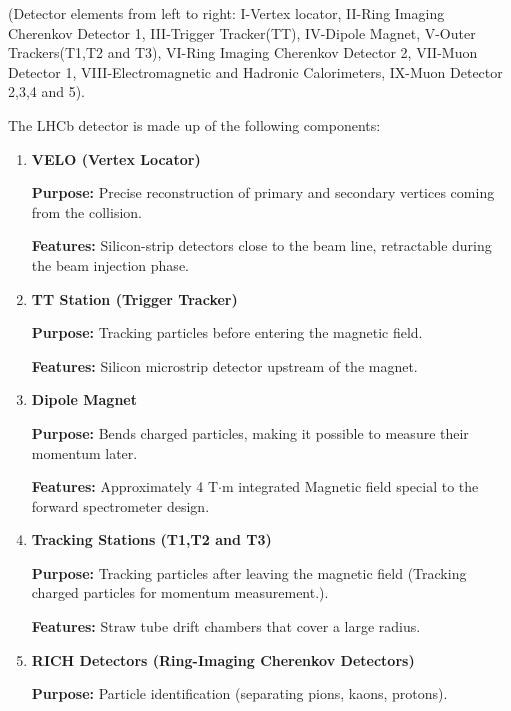 (Detector elements from left to right:  I-Vertex locator, II-Ring Imaging Cherenkov Detector 1, III-Trigger Tracker(TT), IV-Dipole Magnet, V-Outer Trackers(T1,T2 and T3), VI-Ring Imaging Cherenkov Detector 2, VII-Muon Detector 1, VIII-Electromagnetic and Hadronic Calorimeters, IX-Muon Detector 2,3,4 and 5).

The LHCb detector is made up of the following components:
\begin{enumerate}[label=\textbf{\arabic*.}]
    \item \textbf{VELO (Vertex Locator)}
    
    \textbf{Purpose:} Precise reconstruction of primary and secondary vertices coming from the collision.
    
    \textbf{Features:} Silicon-strip detectors close to the beam line, retractable during the beam injection phase.
    \item \textbf{TT Station (Trigger Tracker)}
    
    \textbf{Purpose:} Tracking particles before entering the magnetic field.
    
    \textbf{Features:} Silicon microstrip detector upstream of the magnet.
    \item \textbf{Dipole Magnet}
    
    \textbf{Purpose:} Bends charged particles, making it possible to measure their momentum later.
        
    \textbf{Features:} Approximately 4 T$\cdot$m integrated Magnetic field special to the forward spectrometer design.
    \item \textbf{Tracking Stations (T1,T2 and T3)}
    
    \textbf{Purpose:} Tracking particles after leaving the magnetic field (Tracking charged particles for momentum measurement.).
    
    \textbf{Features:} Straw tube drift chambers that cover a large radius.
    \item \textbf{RICH Detectors (Ring-Imaging Cherenkov Detectors)}
    
    \textbf{Purpose:} Particle identification (separating pions, kaons, protons).
    

\end{enumerate}
